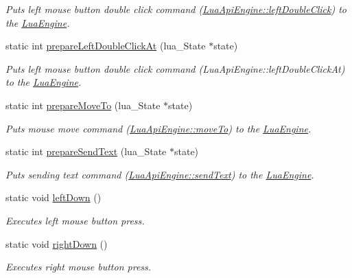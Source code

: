 \begin{DoxyCompactItemize}
\begin{DoxyCompactList}\small\item\em Puts left mouse button double click command (\hyperlink{class_lua_api_engine_a2004f3ce56fc785e0276491642e39e7a}{Lua\-Api\-Engine\-::left\-Double\-Click}) to the \hyperlink{class_lua_engine}{Lua\-Engine}. \end{DoxyCompactList}\item 
static int \hyperlink{class_lua_api_engine_afb3a41719b02c24b851ff53a029207e6}{prepare\-Left\-Double\-Click\-At} (lua\-\_\-\-State $\ast$state)
\begin{DoxyCompactList}\small\item\em Puts left mouse button double click command (Lua\-Api\-Engine\-::left\-Double\-Click\-At) to the \hyperlink{class_lua_engine}{Lua\-Engine}. \end{DoxyCompactList}\item 
static int \hyperlink{class_lua_api_engine_a700aa78e4509bca70b5b23cfe98ce7b3}{prepare\-Move\-To} (lua\-\_\-\-State $\ast$state)
\begin{DoxyCompactList}\small\item\em Puts mouse move command (\hyperlink{class_lua_api_engine_a8512ba309e37218b1586f8a41cae4451}{Lua\-Api\-Engine\-::move\-To}) to the \hyperlink{class_lua_engine}{Lua\-Engine}. \end{DoxyCompactList}\item 
static int \hyperlink{class_lua_api_engine_a8f327b5c6d5819c9078b53a665842c47}{prepare\-Send\-Text} (lua\-\_\-\-State $\ast$state)
\begin{DoxyCompactList}\small\item\em Puts sending text command (\hyperlink{class_lua_api_engine_a396ae61c3f7c771f5fe06584cef15169}{Lua\-Api\-Engine\-::send\-Text}) to the \hyperlink{class_lua_engine}{Lua\-Engine}. \end{DoxyCompactList}\item 
static void \hyperlink{class_lua_api_engine_a5942498f999031601960d890b259536b}{left\-Down} ()
\begin{DoxyCompactList}\small\item\em Executes left mouse button press. \end{DoxyCompactList}\item 
static void \hyperlink{class_lua_api_engine_a14df77fdabe3ddf5dd19c35e70acb2d8}{right\-Down} ()
\begin{DoxyCompactList}\small\item\em Executes right mouse button press. \end{DoxyCompactList}\item 

\end{DoxyCompactItemize}
